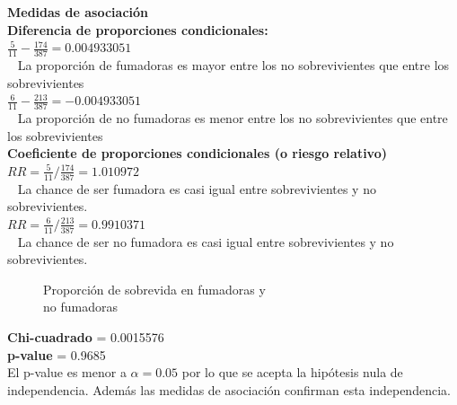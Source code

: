\documentclass[12pt,letterpaper,fleqn]{article}
\begin{document}
\begin{enumerate}[label=\textbf{\arabic*.}]
\begin{enumerate}[label=\textbf{\alph*.}]
                \textbf{Medidas de asociación} \\
                \textbf{Diferencia de proporciones condicionales:} \\
                $ \frac{5}{11}-\frac{174}{387} = 0.004933051 $ \\ 
                La proporción de fumadoras es mayor entre los no sobrevivientes que entre los sobrevivientes \\
                $ \frac{6}{11}-\frac{213}{387} = -0.004933051 $ \\ 
                La proporción de no fumadoras es menor entre los no sobrevivientes que entre los sobrevivientes\\

                \textbf{Coeficiente de proporciones condicionales (o riesgo relativo)}\\
                 $ RR =  \frac{5}{11}/\frac{174}{387} = 1.010972 $ \\ 
                 La chance de ser fumadora es casi igual entre sobrevivientes y no sobrevivientes.\\
                 $ RR =  \frac{6}{11}/\frac{213}{387} = 0.9910371 $ \\ 
                 La chance de ser no fumadora es casi igual entre sobrevivientes y no sobrevivientes.\\

                \begin{figure}[!htb]
                    \centering
                    
                    \caption{Proporción de sobrevida en fumadoras y \\no fumadoras}
                    \label{fig:figure2}
                \end{figure}
                \FloatBarrier
                \textbf{Chi-cuadrado} = 0.0015576 \\
                \textbf{p-value} = 0.9685 \\
                El p-value es menor a $ \alpha =0.05 $ por lo que se acepta la hipótesis nula de independencia. Además las medidas de asociación confirman esta independencia. \\


\end{enumerate}
\end{enumerate}
\end{document}
